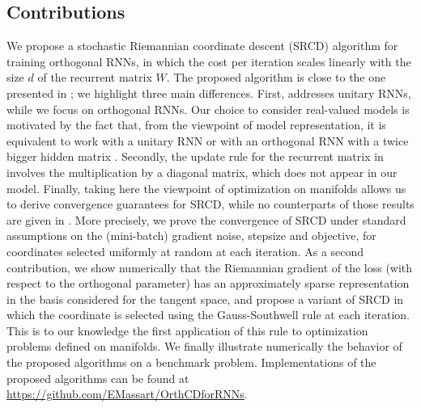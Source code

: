 \documentclass{article}
\begin{document}
\subsection{Contributions}
We propose a stochastic Riemannian coordinate descent (SRCD) algorithm for training orthogonal RNNs, in which the cost per iteration scales linearly with the size $d$ of the recurrent matrix $W$. The proposed algorithm is close to the one presented in \cite{Jing2017}; we highlight three main differences. First, \cite{Jing2017} addresses unitary RNNs, while we focus on orthogonal RNNs. Our choice to consider real-valued models is motivated by the fact that, from the viewpoint of model representation, it is equivalent to work with a unitary RNN or with an orthogonal RNN with a twice bigger hidden matrix \cite{Mhammedi2017}. Secondly, the update rule for the recurrent matrix in \cite{Jing2017} involves the multiplication by a diagonal matrix, which does not appear in our model. Finally, taking here the viewpoint of optimization on manifolds allows us to derive convergence guarantees for SRCD, while no counterparts of those results are given in \cite{Jing2017}. More precisely, we prove the convergence of SRCD under standard assumptions on the (mini-batch) gradient noise, stepsize and objective, for coordinates selected uniformly at random at each iteration. As a second contribution, we show numerically that the Riemannian gradient of the loss (with respect to the orthogonal parameter) has an approximately sparse representation in the basis considered for the tangent space, and propose a variant of SRCD in which the coordinate is selected using the Gauss-Southwell rule at each iteration. This is to our knowledge the first application of this rule to optimization problems defined on manifolds. We finally illustrate numerically the behavior of the proposed algorithms on a benchmark problem. Implementations of the proposed algorithms can be found at \url{https://github.com/EMassart/OrthCDforRNNs}.%

\end{document}
